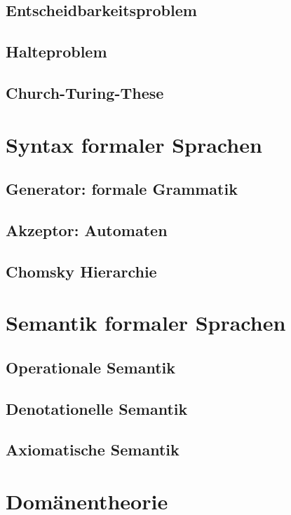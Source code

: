 \subsection{Entscheidbarkeitsproblem}

\subsection{Halteproblem}

\subsection{Church-Turing-These}

\section{Syntax formaler Sprachen}

\subsection{Generator: formale Grammatik}

\subsection{Akzeptor: Automaten}

\subsection{Chomsky Hierarchie}

\section{Semantik formaler Sprachen}

\subsection{Operationale Semantik}

\subsection{Denotationelle Semantik}

\subsection{Axiomatische Semantik}

\section{Domänentheorie}
